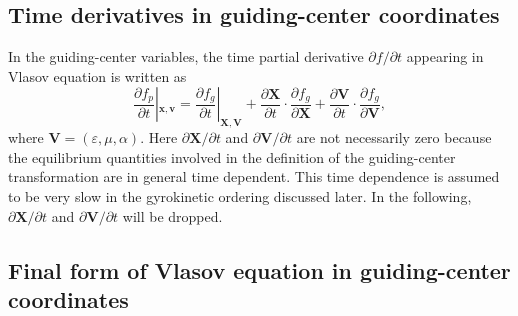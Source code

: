 \documentclass{llncs}
\newcommand{\nobracket}{}
\begin{document}
\subsection{Time derivatives in guiding-center coordinates}

In the guiding-center variables, the time partial derivative $\partial f /
\partial t$ appearing in Vlasov equation is written as
\begin{equation}
  \frac{\partial f_p}{\partial t} |_{\mathbf{x}, \mathbf{v}} \nobracket =
  \frac{\partial f_g}{\partial t} |_{\mathbf{X}, \mathbf{V}} \nobracket +
  \frac{\partial \mathbf{X}}{\partial t} \cdot \frac{\partial f_g}{\partial
  \mathbf{X}} + \frac{\partial \mathbf{V}}{\partial t} \cdot \frac{\partial
  f_g}{\partial \mathbf{V}},
\end{equation}
where $\mathbf{V}= (\varepsilon, \mu, \alpha)$. Here $\partial \mathbf{X}/
\partial t$ and $\partial \mathbf{V}/ \partial t$ are not necessarily zero
because the equilibrium quantities involved in the definition of the
guiding-center transformation are in general time dependent. This time
dependence is assumed to be very slow in the gyrokinetic ordering discussed
later. In the following, $\partial \mathbf{X}/ \partial t$ and $\partial
\mathbf{V}/ \partial t$ will be dropped.

\subsection{Final form of Vlasov equation in guiding-center coordinates}
\end{document}
